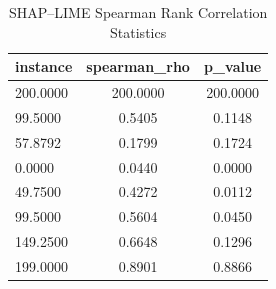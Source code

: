 \begin{table}
\centering
\caption{SHAP–LIME Spearman Rank Correlation Statistics}
\label{tab:agreement}
\begin{tabular}{lcc}
\toprule
instance & spearman_rho & p_value \\
\midrule
200.0000 & 200.0000 & 200.0000 \\
99.5000 & 0.5405 & 0.1148 \\
57.8792 & 0.1799 & 0.1724 \\
0.0000 & 0.0440 & 0.0000 \\
49.7500 & 0.4272 & 0.0112 \\
99.5000 & 0.5604 & 0.0450 \\
149.2500 & 0.6648 & 0.1296 \\
199.0000 & 0.8901 & 0.8866 \\
\bottomrule
\end{tabular}
\end{table}
